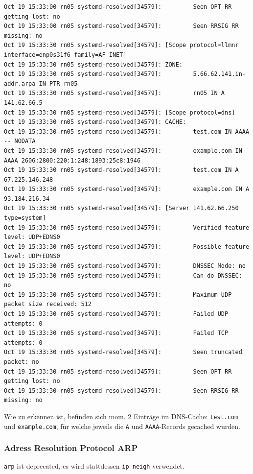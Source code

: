 \begin{verbatim}
Oct 19 15:33:00 rn05 systemd-resolved[34579]:         Seen OPT RR getting lost: no
Oct 19 15:33:00 rn05 systemd-resolved[34579]:         Seen RRSIG RR missing: no
Oct 19 15:33:30 rn05 systemd-resolved[34579]: [Scope protocol=llmnr interface=enp0s31f6 family=AF_INET]
Oct 19 15:33:30 rn05 systemd-resolved[34579]: ZONE:
Oct 19 15:33:30 rn05 systemd-resolved[34579]:         5.66.62.141.in-addr.arpa IN PTR rn05
Oct 19 15:33:30 rn05 systemd-resolved[34579]:         rn05 IN A 141.62.66.5
Oct 19 15:33:30 rn05 systemd-resolved[34579]: [Scope protocol=dns]
Oct 19 15:33:30 rn05 systemd-resolved[34579]: CACHE:
Oct 19 15:33:30 rn05 systemd-resolved[34579]:         test.com IN AAAA -- NODATA
Oct 19 15:33:30 rn05 systemd-resolved[34579]:         example.com IN AAAA 2606:2800:220:1:248:1893:25c8:1946
Oct 19 15:33:30 rn05 systemd-resolved[34579]:         test.com IN A 67.225.146.248
Oct 19 15:33:30 rn05 systemd-resolved[34579]:         example.com IN A 93.184.216.34
Oct 19 15:33:30 rn05 systemd-resolved[34579]: [Server 141.62.66.250 type=system]
Oct 19 15:33:30 rn05 systemd-resolved[34579]:         Verified feature level: UDP+EDNS0
Oct 19 15:33:30 rn05 systemd-resolved[34579]:         Possible feature level: UDP+EDNS0
Oct 19 15:33:30 rn05 systemd-resolved[34579]:         DNSSEC Mode: no
Oct 19 15:33:30 rn05 systemd-resolved[34579]:         Can do DNSSEC: no
Oct 19 15:33:30 rn05 systemd-resolved[34579]:         Maximum UDP packet size received: 512
Oct 19 15:33:30 rn05 systemd-resolved[34579]:         Failed UDP attempts: 0
Oct 19 15:33:30 rn05 systemd-resolved[34579]:         Failed TCP attempts: 0
Oct 19 15:33:30 rn05 systemd-resolved[34579]:         Seen truncated packet: no
Oct 19 15:33:30 rn05 systemd-resolved[34579]:         Seen OPT RR getting lost: no
Oct 19 15:33:30 rn05 systemd-resolved[34579]:         Seen RRSIG RR missing: no
\end{verbatim}

Wie zu erkennen ist, befinden sich mom. 2 Einträge im DNS-Cache:
\texttt{test.com} und \texttt{example.com}, für welche jeweils die
\texttt{A} und \texttt{AAAA}-Records gecached wurden.

\hypertarget{adress-resolution-protocol-arp}{%
\subsubsection{Adress Resolution Protocol
ARP}\label{adress-resolution-protocol-arp}}

\texttt{arp} ist deprecated, es wird stattdessen \texttt{ip\ neigh}
verwendet.

